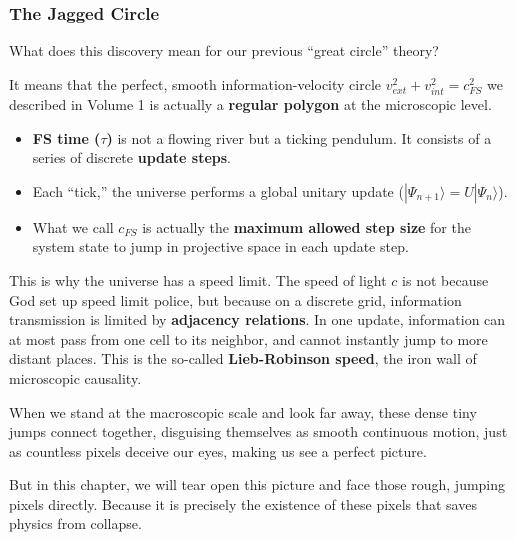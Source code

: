 \subsubsection{The Jagged Circle}

What does this discovery mean for our previous ``great circle'' theory?

It means that the perfect, smooth information-velocity circle $v_{ext}^2 + v_{int}^2 = c_{FS}^2$ we described in Volume 1 is actually a \textbf{regular polygon} at the microscopic level.

\begin{itemize}
\item \textbf{FS time ($\tau$)} is not a flowing river but a ticking pendulum. It consists of a series of discrete \textbf{update steps}.

\item Each ``tick,'' the universe performs a global unitary update ($|\Psi_{n+1}\rangle = U |\Psi_n\rangle$).

\item What we call $c_{FS}$ is actually the \textbf{maximum allowed step size} for the system state to jump in projective space in each update step.
\end{itemize}

This is why the universe has a speed limit. The speed of light $c$ is not because God set up speed limit police, but because on a discrete grid, information transmission is limited by \textbf{adjacency relations}. In one update, information can at most pass from one cell to its neighbor, and cannot instantly jump to more distant places. This is the so-called \textbf{Lieb-Robinson speed}, the iron wall of microscopic causality.

When we stand at the macroscopic scale and look far away, these dense tiny jumps connect together, disguising themselves as smooth continuous motion, just as countless pixels deceive our eyes, making us see a perfect picture.

But in this chapter, we will tear open this picture and face those rough, jumping pixels directly. Because it is precisely the existence of these pixels that saves physics from collapse.

